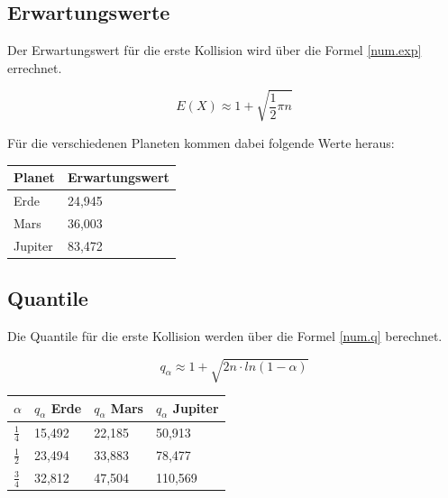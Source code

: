 \documentclass[../main.tex]{subfiles}
\begin{document}
\subsection{Erwartungswerte}

Der Erwartungswert für die erste Kollision wird über die Formel \ref{num.exp} errechnet.

\begin{equation}
 E(X) \approx 1 + \sqrt{\frac{1}{2} \pi n}
 \label{num.exp}
\end{equation}

Für die verschiedenen Planeten kommen dabei folgende Werte heraus:

\begin{center}
\begin{tabular}{|l|l|}
\hline
\textbf{Planet} & \textbf{Erwartungswert}\\ \hline
Erde & 24,945\\ \hline
Mars & 36,003\\ \hline
Jupiter & 83,472 \\ \hline
\end{tabular}
\end{center}

\subsection{Quantile}

Die Quantile für die erste Kollision werden über die Formel \ref{num.q} berechnet.

\begin{equation}
 q_{\alpha} \approx 1 + \sqrt{2n \cdot ln(1-\alpha)}
 \label{num.q}
\end{equation}

\begin{table}[h]
\centering
\begin{tabular}{|l|l|l|l|}
\hline
$\alpha$      & $q_{\alpha}$ Erde & $q_{\alpha}$ Mars & $q_{\alpha}$ Jupiter \\ \hline
$\frac{1}{4}$ & 15,492            & 22,185            & 50,913               \\
$\frac{1}{2}$ & 23,494            & 33,883            & 78,477               \\
$\frac{3}{4}$ & 32,812            & 47,504            & 110,569              \\ \hline
\end{tabular}
\end{table}
\end{document}
